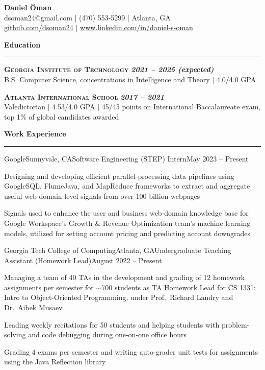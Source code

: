 \documentclass{article}
\newcommand{\horizontal}{\vspace{2pt}\hrule}
\newcommand{\school}[3]{\vspace{2pt}\textsc{\textbf{#1}} \hfill \textbf{\textit{#2}} \\ #3}
\newcommand{\sectitle}[1]{\vspace{2pt} \textbf{\large #1} \horizontal}
\begin{document}
\thispagestyle{empty}
\begin{center}
    \textbf{\LARGE Daniel Öman} \\
    dsoman24@gmail.com $|$ (470) 553-5299 $|$ Atlanta, GA \\
    \href{https://github.com/dsoman24}{github.com/dsoman24} $|$ \href{https://www.linkedin.com/in/daniel-s-oman/}{www.linkedin.com/in/daniel-s-oman}
\end{center}

\begin{flushleft}
\sectitle{Education}

\school{Georgia Institute of Technology}{2021 -- 2025 (expected)}
{B.S. Computer Science, concentrations in Intelligence and Theory $|$ 4.0/4.0 GPA}

\school{Atlanta International School}{2017 -- 2021}
{Valedictorian $|$ 4.53/4.0 GPA $|$ 45/45 points on International Baccalaureate exam, top 1\% of global candidates awarded}

\sectitle{Work Experience}

    \begin{experience}{Google}{Sunnyvale, CA}{Software Engineering (STEP) Intern}{May 2023 -- Present}
        \item Designing and developing efficient parallel-processing data pipelines using GoogleSQL, FlumeJava, and MapReduce frameworks to extract and aggregate useful web-domain level signals from over 100 billion webpages
        \item Signals used to enhance the user and business web-domain knowledge base for Google Workspace's Growth \& Revenue Optimization team's machine learning models, utilized for setting account pricing and predicting account downgrades %
    \end{experience}

    \begin{experience}{Georgia Tech College of Computing}{Atlanta, GA}{Undergraduate Teaching Assistant (Homework Lead)}{August 2022 -- Present}
        \item Managing a team of 40 TAs in the development and grading of 12 homework assignments per semester for $\sim$700 students as TA Homework Lead for CS 1331: Intro to Object-Oriented Programming, under Prof.~Richard Landry and Dr.~Aibek Musaev
        \item Leading weekly recitations for 50 students and helping students with problem-solving and code debugging during one-on-one office hours
        \item Grading 4 exams per semester and writing auto-grader unit tests for assignments using the Java Reflection library %
    \end{experience}


\end{flushleft}
\end{document}

